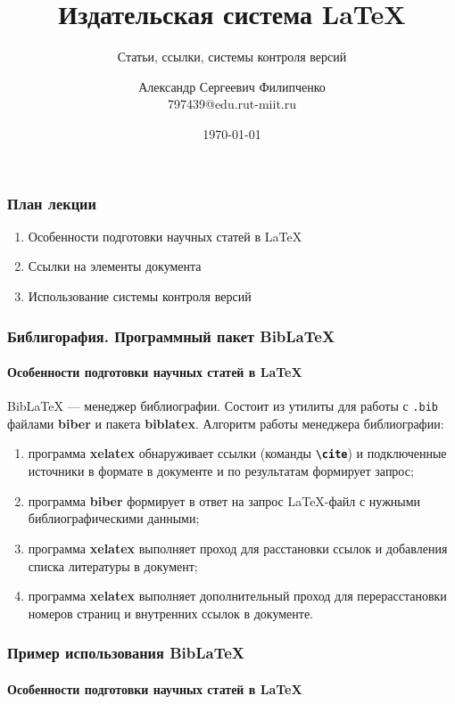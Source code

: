 \documentclass[aspectratio=169]{beamer}
\title[Заголовок]{Издательская система \LaTeX{}}
\subtitle{Статьи, ссылки, системы контроля версий}
\author[Имя автора]{Александр Сергеевич Филипченко \\ \smallskip \scriptsize 797439@edu.rut-miit.ru\\}
\institute{кафедра <<Вычислительные системы, сети и информационная безопасность>>}
\date{\today}
\begin{document}

\frame[plain]{\titlepage}	%

\begin{frame}
\frametitle{План лекции}
\begin{enumerate} 
\item Особенности подготовки научных статей в \LaTeX{}
\item Ссылки на элементы документа
\item Использование системы контроля версий
\end{enumerate} 
\end{frame}

\begin{frame}
\frametitle{Библигорафия. Программный пакет BibLaTeX}
\framesubtitle{Особенности подготовки научных статей в \LaTeX{}}
BibLaTeX --- менеджер библиографии.
Состоит из утилиты для работы с \texttt{.bib} файлами \textbf{biber} и пакета \textbf{biblatex}.
Алгоритм работы менеджера библиографии:
\begin{enumerate} 
\item программа \textbf{xelatex} обнаруживает ссылки (команды \texttt{\textbf{\textbackslash cite}}) и подключенные источники в формате в документе и по результатам формирует запрос;
\item программа \textbf{biber} формирует в ответ на запрос LaTeX-файл с нужными библиографическими данными;
\item программа \textbf{xelatex} выполняет проход для расстановки ссылок и добавления списка литературы в документ;
\item программа \textbf{xelatex} выполняет дополнительный проход для перерасстановки номеров страниц и внутренних ссылок в документе.
\end{enumerate} 
\end{frame}

\begin{frame}
\frametitle{Пример использования BibLaTeX}
\framesubtitle{Особенности подготовки научных статей в \LaTeX{}}
\end{frame}
\end{document}

